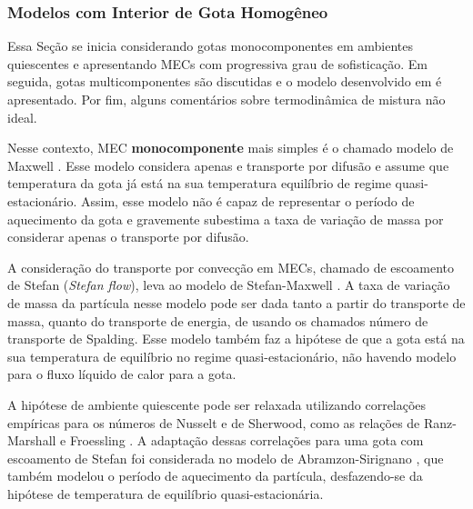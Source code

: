 \subsubsection{Modelos com Interior de Gota Homogêneo} \label{sec:RMM}

Essa Seção se inicia considerando gotas monocomponentes em ambientes quiescentes e apresentando MECs com progressiva grau de sofisticação.
Em seguida, gotas multicomponentes são discutidas e o modelo desenvolvido em \cite{SacomanoF2022IJHMT} é apresentado.
Por fim, alguns comentários sobre termodinâmica de mistura não ideal.


Nesse contexto, MEC \textbf{monocomponente} mais simples é o  chamado modelo de Maxwell \cite{Fuchs1959,Sazhin2006}.
Esse modelo considera apenas e transporte por difusão e assume que temperatura da gota já está na sua temperatura equilíbrio de regime quasi-estacionário.
Assim, esse modelo não é capaz de representar o período de aquecimento da gota e gravemente subestima a taxa de variação de massa por considerar apenas o transporte por difusão.

A consideração do transporte por convecção em MECs, chamado de escoamento de Stefan (\emph{Stefan flow}), leva ao modelo de Stefan-Maxwell \cite{Law1978}.
A taxa de variação de massa da partícula nesse modelo pode ser dada tanto a partir do transporte de massa, quanto do transporte de energia, de usando os chamados número de transporte de Spalding.
Esse modelo também faz a hipótese de que a gota está na sua temperatura de equilíbrio no regime quasi-estacionário, não havendo modelo para o fluxo líquido de calor para a gota.

A hipótese de ambiente quiescente pode ser relaxada utilizando correlações empíricas para os números de Nusselt e de Sherwood, como as relações de Ranz-Marshall e Froessling \cite{Bird2002}. 
A adaptação dessas correlações para uma gota com escoamento de Stefan foi considerada no modelo de Abramzon-Sirignano \cite{Sirignano1989}, que também modelou o período de aquecimento da partícula, desfazendo-se da hipótese de temperatura de equilíbrio quasi-estacionária.

